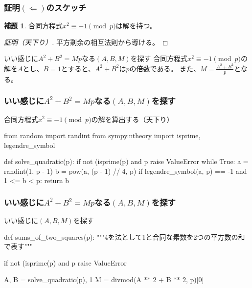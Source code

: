 \documentclass[dvipdfmx,11pt,notheorems]{beamer}
\theoremstyle{definition}
\newtheorem{lemma}{補題}
\begin{document}
\begin{frame}\frametitle{証明$(\Leftarrow)$のスケッチ}

\begin{lemma}
合同方程式$x^{2} \equiv -1 \pmod{p}$は解を持つ。
\end{lemma}

\begin{proof}[証明（天下り）]
平方剰余の相互法則から導ける。
\end{proof}

\begin{exampleblock}{いい感じに$A^{2}+B^{2} = Mp$なる$(A, B, M)$を探す}
合同方程式$x^{2} \equiv -1 \pmod{p}$の解を$A$とし、$B=1$とすると、$A^{2}+B^{2}$は$p$の倍数である。
また、$\displaystyle M=\frac{A^{2} + B^{2}}{p}$となる。
\end{exampleblock}

\end{frame}

\begin{frame}[fragile]\frametitle{いい感じに$A^{2}+B^{2} = Mp$なる$(A, B, M)$を探す}

\begin{block}{合同方程式$x^{2} \equiv -1 \pmod{p}$の解を算出する（天下り）}
\begin{pyverbatim}
from random import randint
from sympy.ntheory import isprime, legendre_symbol


def solve_quadratic(p):
    if not (isprime(p) and p %
        raise ValueError
    while True:
        a = randint(1, p - 1)
        b = pow(a, (p - 1) // 4, p)
        if legendre_symbol(a, p) == -1 and 1 <= b < p:
            return b
\end{pyverbatim}
\end{block}

\end{frame}

\begin{frame}[fragile]\frametitle{いい感じに$A^{2}+B^{2} = Mp$なる$(A, B, M)$を探す}

\begin{block}{いい感じに$(A, B, M)$を探す}
\begin{pyverbatim}
def sums_of_two_squares(p):
    """4を法として1と合同な素数を2つの平方数の和で表す"""

    if not (isprime(p) and p %
        raise ValueError
            
    A, B = solve_quadratic(p), 1
    M = divmod(A ** 2 + B ** 2, p)[0]
\end{pyverbatim}
\end{block}

\end{frame}
\end{document}
